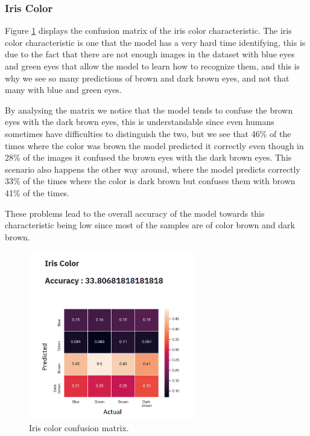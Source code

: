 \documentclass[12pt,a4paper,oneside]{memoir}
\begin{document}
\subsubsection{Iris Color}
Figure \ref{fig:Iris_lock_color} displays the confusion matrix of the iris color characteristic. The iris color characteristic is one that the model has a very hard time identifying, this is due to the fact that there are not enough images in the dataset with blue eyes and green eyes that allow the model to learn how to recognize them, and this is why we see so many predictions of brown and dark brown eyes, and not that many with blue and green eyes.


\par

 By analysing the matrix we notice that the model tends to confuse the brown eyes with the dark brown eyes, this is understandable since even humans sometimes have difficulties to distinguish the two, but we see that 46\% of the times where the color was brown the model predicted it correctly even though in 28\% of the images it confused the brown eyes with the dark brown eyes. This scenario also happens the other way around, where the model predicts correctly 33\% of the times where the color is dark brown but confuses them with brown 41\% of the times. 
 
 \par
 
 These problems lead to the overall accuracy of the model towards this characteristic being low since most of the samples are of color brown and dark brown.

\begin{figure}[H]
\centering
\includegraphics[width=0.65\textwidth]{images/Iris_lock_color.png}
\caption{Iris color confusion matrix.}
\centering
\label{fig:Iris_lock_color}
\end{figure}
\end{document}
